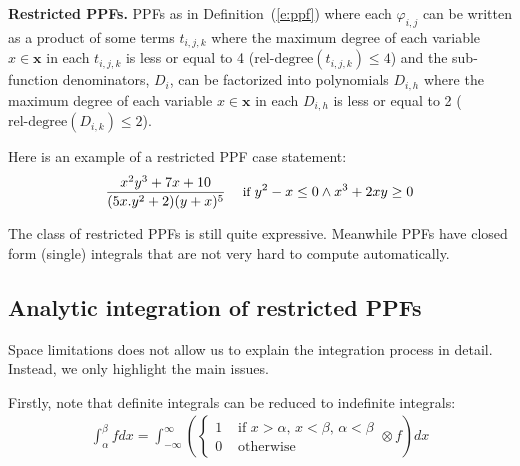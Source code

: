 \documentclass[letterpaper]{article}
\renewcommand{\vec}[1]{\mathbf{#1}}
\newcommand{\bvec}[1]{\textbf{#1}}
\newcommand{\case}[2]{#2 &\text{ if } #1}%
\newcommand{\singlecase}[2]{#2 \quad \text{ if } #1}
\newcommand{\otherwise}[1]{#1 &\text{ otherwise}}
\begin{document}
\textbf{Restricted PPFs. }
PPFs as in Definition~(\ref{e:ppf}) where 
each $\varphi_{i,j}$
can be written as a product of some terms $t_{i,j,k}$ where the maximum degree of each variable $x \in \bvec{x}$ in each $t_{i,j,k}$ is less or equal to 4 ($\text{rel-degree}(t_{i,j,k}) \leq 4$)
and the sub-function denominators, $D_{i}$, can be factorized into polynomials ${D}_{i,h}$ where the maximum degree of each variable $x \in \bvec{x}$ in each $D_{i,h}$ is less or equal to 2 ($\text{rel-degree}(D_{i, k}) \leq 2$).%

Here is an example of a restricted PPF case statement:
\begin{equation*}
{\footnotesize
\singlecase{y^2-x\leq 0 \wedge x^3+2xy \geq 0}{\frac{x^2 y^3 + 7x + 10}{(5x.y^2 + 2)(y + x)^5}}
}
\end{equation*}

The class of restricted PPFs is still quite expressive. Meanwhile PPFs have closed form (single) integrals that are not very hard to compute automatically. 

\subsection{Analytic integration of restricted PPFs}
Space limitations does not allow us to explain the integration process in detail. 
Instead, we only highlight the main issues.

Firstly, note that definite integrals can be reduced to indefinite integrals:
\begin{align*}
\int_{\alpha}^{\beta} f dx  = 
\int_{-\infty}^{\infty}
\left (
  \begin{cases}
  \case{x\!>\!\alpha,\, x\!<\!\beta,\, \alpha \!<\! \beta}{1}\\
 \otherwise{0}    
  \end{cases}
\otimes
  f
\right)
dx
\end{align*}
\end{document}
